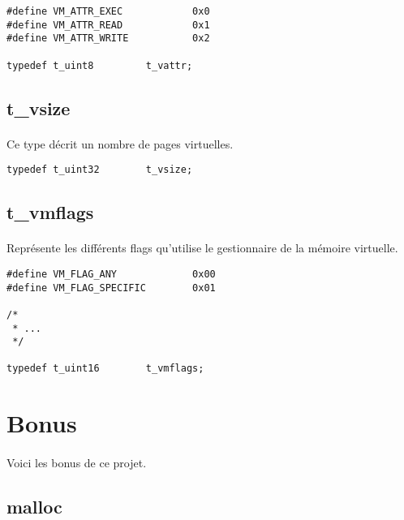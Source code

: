 \documentclass[10pt,a4wide]{article}
\begin{document}
\begin{verbatim}
#define VM_ATTR_EXEC            0x0
#define VM_ATTR_READ            0x1
#define VM_ATTR_WRITE           0x2

typedef t_uint8         t_vattr;
\end{verbatim}

\subsection{t\_vsize}

\paragraph{}

Ce type d\'ecrit un nombre de pages virtuelles.

\begin{verbatim}
typedef t_uint32        t_vsize;
\end{verbatim}

\subsection{t\_vmflags}

\paragraph{}

Repr\'esente les diff\'erents flags qu'utilise le gestionnaire de la m\'emoire
virtuelle.

\begin{verbatim}
#define VM_FLAG_ANY             0x00
#define VM_FLAG_SPECIFIC        0x01

/*
 * ...
 */

typedef t_uint16        t_vmflags;
\end{verbatim}

\section{Bonus}

\paragraph{}

Voici les bonus de ce projet.

\subsection{malloc}
\end{document}

